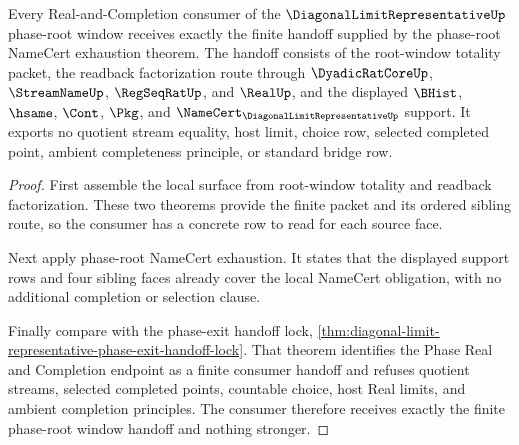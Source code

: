 \begin{theorem}
\label{thm:diagonal-limit-representative-phase-root-consumer-handoff}
Every Real-and-Completion consumer of the $\DiagonalLimitRepresentativeUp$ phase-root window receives exactly the finite handoff supplied by the phase-root NameCert exhaustion theorem. The handoff consists of the root-window totality packet, the readback factorization route through $\DyadicRatCoreUp$, $\StreamNameUp$, $\RegSeqRatUp$, and $\RealUp$, and the displayed $\BHist$, $\hsame$, $\Cont$, $\Pkg$, and $\NameCert_{\DiagonalLimitRepresentativeUp}$ support. It exports no quotient stream equality, host limit, choice row, selected completed point, ambient completeness principle, or standard bridge row.
\end{theorem}
\begin{proof}
First assemble the local surface from root-window totality and readback factorization. These two theorems provide the finite packet and its ordered sibling route, so the consumer has a concrete row to read for each source face.

Next apply phase-root NameCert exhaustion. It states that the displayed support rows and four sibling faces already cover the local NameCert obligation, with no additional completion or selection clause.

Finally compare with the phase-exit handoff lock, \autoref{thm:diagonal-limit-representative-phase-exit-handoff-lock}. That theorem identifies the Phase Real and Completion endpoint as a finite consumer handoff and refuses quotient streams, selected completed points, countable choice, host Real limits, and ambient completion principles. The consumer therefore receives exactly the finite phase-root window handoff and nothing stronger.
\end{proof}
